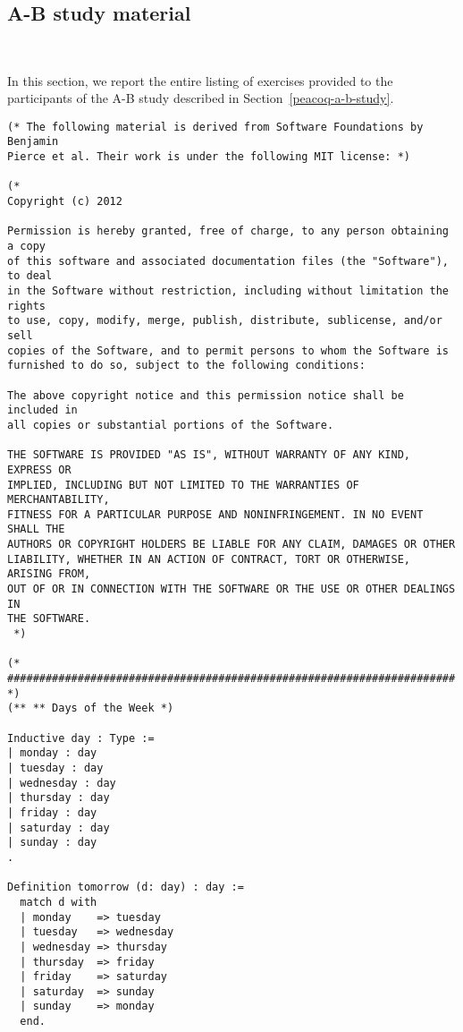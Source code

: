 \chapter{\PeaCoq{}}~\label{appendix-peacoq}

\section{\PeaCoq{} A-B study material}~\label{appendix-peacoq-material}

In this section, we report the entire listing of exercises provided to the participants of the A-B study described in Section~\ref{peacoq-a-b-study}.

\begin{verbatim}
(* The following material is derived from Software Foundations by Benjamin
Pierce et al. Their work is under the following MIT license: *)

(*
Copyright (c) 2012

Permission is hereby granted, free of charge, to any person obtaining a copy
of this software and associated documentation files (the "Software"), to deal
in the Software without restriction, including without limitation the rights
to use, copy, modify, merge, publish, distribute, sublicense, and/or sell
copies of the Software, and to permit persons to whom the Software is
furnished to do so, subject to the following conditions:

The above copyright notice and this permission notice shall be included in
all copies or substantial portions of the Software.

THE SOFTWARE IS PROVIDED "AS IS", WITHOUT WARRANTY OF ANY KIND, EXPRESS OR
IMPLIED, INCLUDING BUT NOT LIMITED TO THE WARRANTIES OF MERCHANTABILITY,
FITNESS FOR A PARTICULAR PURPOSE AND NONINFRINGEMENT. IN NO EVENT SHALL THE
AUTHORS OR COPYRIGHT HOLDERS BE LIABLE FOR ANY CLAIM, DAMAGES OR OTHER
LIABILITY, WHETHER IN AN ACTION OF CONTRACT, TORT OR OTHERWISE, ARISING FROM,
OUT OF OR IN CONNECTION WITH THE SOFTWARE OR THE USE OR OTHER DEALINGS IN
THE SOFTWARE.
 *)

(* ###################################################################### *)
(** ** Days of the Week *)

Inductive day : Type :=
| monday : day
| tuesday : day
| wednesday : day
| thursday : day
| friday : day
| saturday : day
| sunday : day
.

Definition tomorrow (d: day) : day :=
  match d with
  | monday    => tuesday
  | tuesday   => wednesday
  | wednesday => thursday
  | thursday  => friday
  | friday    => saturday
  | saturday  => sunday
  | sunday    => monday
  end.


\end{verbatim}
